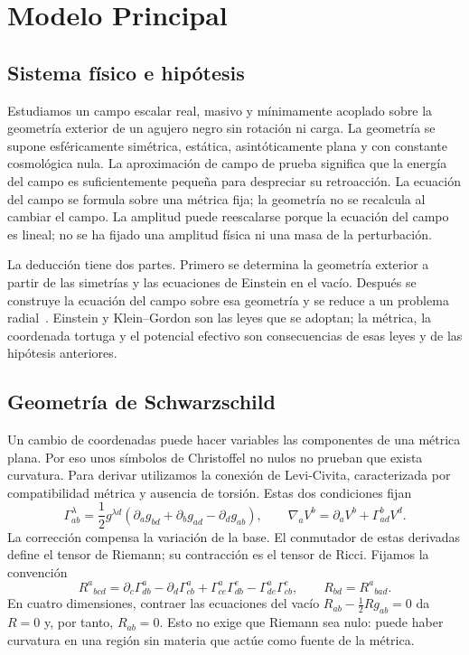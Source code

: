 \chapter{Modelo Principal}
\label{ch:modelo-principal}

\section{Sistema físico e hipótesis}

Estudiamos un campo escalar real, masivo y mínimamente acoplado sobre la
geometría exterior de un agujero negro sin rotación ni carga. La geometría
se supone esféricamente simétrica, estática, asintóticamente plana y con
constante cosmológica nula. La aproximación de campo de prueba significa
que la energía del campo es suficientemente pequeña para despreciar su
retroacción. La ecuación del campo se formula sobre una métrica fija;
la geometría no se recalcula al cambiar el campo. La amplitud puede reescalarse porque
la ecuación del campo es lineal; no se ha fijado una amplitud física ni una masa de la perturbación.

La deducción tiene dos partes. Primero se determina la geometría exterior
a partir de las simetrías y las ecuaciones de Einstein en el vacío.
Después se construye la ecuación del campo sobre esa geometría y se reduce
a un problema radial~\cite{TongGR}. Einstein y Klein--Gordon son las leyes
que se adoptan; la métrica, la coordenada tortuga y el potencial efectivo
son consecuencias de esas leyes y de las hipótesis anteriores.

\section{Geometría de Schwarzschild}

Un cambio de coordenadas puede hacer variables las componentes de una
métrica plana. Por eso unos símbolos de Christoffel no nulos no prueban
que exista curvatura. Para derivar utilizamos la conexión de Levi-Civita,
caracterizada por compatibilidad métrica y ausencia de torsión. Estas dos
condiciones fijan
\begin{equation}
\Gamma^\lambda_{ab}=\frac12g^{\lambda d}
 (\partial_a g_{bd}+\partial_b g_{ad}-\partial_d g_{ab}),\qquad
\nabla_a V^b=\partial_a V^b+\Gamma^b_{ad}V^d.
\label{eq:levi-civita}
\end{equation}
La corrección compensa la variación de la base. El conmutador de estas
derivadas define el tensor de Riemann; su contracción es el tensor de
Ricci. Fijamos la convención
\[
R^a{}_{bcd}=\partial_c\Gamma^a_{db}-\partial_d\Gamma^a_{cb}
 +\Gamma^a_{ce}\Gamma^e_{db}-\Gamma^a_{de}\Gamma^e_{cb},
\qquad R_{bd}=R^a{}_{bad}.
\]
En cuatro dimensiones, contraer las ecuaciones del vacío
$R_{ab}-\tfrac12Rg_{ab}=0$ da $R=0$ y, por tanto, $R_{ab}=0$.
Esto no exige que Riemann sea nulo: puede haber curvatura en una región
sin materia que actúe como fuente de la métrica.


